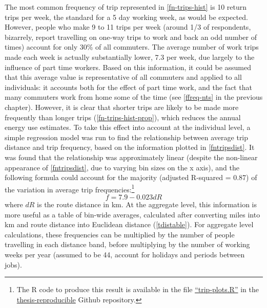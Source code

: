 The most common frequency of trip represented in \cref{fn-trips-hist} is 10
return trips per week, the standard for a 5 day working week, as would be
expected. However, people who make 9 to 11 trips per week (around 1/3 of
respondents, bizarrely, report travelling on one-way trips to work and back
an odd number of times) account for only 30\% of all commuters.
The average number of work trips made each week is actually substantially
lower, 7.3 per week, due largely to the influence of part time workers.
Based on this information, it could be assumed that this average value is
representative
of all commuters and applied to all individuals: it accounts both for the
effect of part time work, and the fact that many commuters work from home
some of the time (see \cref{ffreq-nts} in the previous chapter).
However, it is clear that
shorter trips are likely to be made more frequently than longer trips
(\cref{fn-trips-hist-prop}), which reduces the annual energy use estimates.
To take this effect into account at the individual level, a simple
regression model was run to find the relationship between average trip
distance and trip frequency, based on the information plotted in
\cref{fntripsdist}. It was found that the relationship was
approximately linear (despite the non-linear appearance
of \cref{fntripsdist}, due to varying bin sizes on the x axis),
and the following formula could account for the majority
(adjusted R-squared =  0.87) of the variation in
average trip frequencies:\footnote{The
R code to produce this result is available in the file
{\color{blue} \href{https://github.com/Robinlovelace/thesis-reproducible/blob/master/trip-plots.R}
{``trip-plots.R''}}
in the {\color{blue} \href{https://github.com/Robinlovelace/thesis-reproducible}
{thesis-reproducible}} Github repository.
}
\begin{equation}
 f = 7.9 - 0.023 dR
\end{equation}
where $dR$ is the route distance in km.
At the aggregate level, this information is more useful as a table of
bin-wide averages, calculated after converting miles into km and route distance into
Euclidean distance (\cref{tdistable}). For aggregate level calculations,
these frequencies can be multiplied by the number of people travelling
in each distance band, before multiplying by the number of working weeks
per year (assumed to be 44, account
for holidays and periods between jobs).

